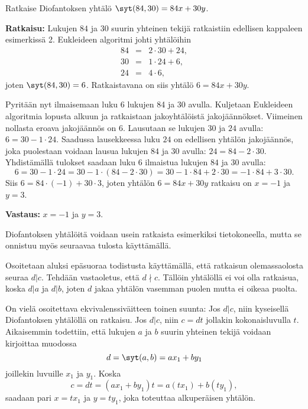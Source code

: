 \begin{esimerkki}
Ratkaise Diofantoksen yhtälö
$\syt(84, 30) = 84x + 30y$.

{\bf Ratkaisu:} Lukujen $84$ ja $30$ suurin yhteinen tekijä
ratkaistiin edellisen kappaleen esimerkissä 2. Eukleideen
algoritmi johti yhtälöihin
\begin{eqnarray*}
84 &=& 2 \cdot 30 + 24,\\
30 &=& 1 \cdot 24 + 6,\\
24 &=& 4 \cdot 6,
\end{eqnarray*}
joten $\syt(84, 30) = 6$. Ratkaistavana on siis yhtälö $6
= 84x + 30y$.

Pyritään nyt ilmaisemaan luku 6 lukujen 84 ja 30 avulla.
Kuljetaan Eukleideen algoritmia lopusta alkuun ja
ratkaistaan jakoyhtälöistä jakojäännökset. Viimeinen
nollasta eroava jakojäännös on $6$. Lausutaan se lukujen
$30$ ja $24$ avulla: $6 = 30 - 1 \cdot 24$. Saadussa
lausekkeessa luku $24$ on edellisen yhtälön jakojäännös,
joka puolestaan voidaan lausua lukujen $84$ ja $30$
avulla: $24 = 84 - 2 \cdot 30$. Yhdistämällä tulokset
saadaan luku $6$ ilmaistua lukujen $84$ ja $30$ avulla:
\[
6 = 30 - 1 \cdot 24 = 30 - 1 \cdot (84 - 2 \cdot 30) = 30
- 1 \cdot 84 + 2 \cdot 30 = -1 \cdot 84 + 3 \cdot 30.
\]
Siis $6 = 84 \cdot (-1) + 30 \cdot 3$, joten yhtälön $6=84x+30y$
ratkaisu on $x = -1$ ja $y = 3$.

{\bf Vastaus:} $x = -1$ ja $y = 3$.
\end{esimerkki}

Diofantoksen yhtälöitä voidaan usein ratkaista esimerkiksi tietokoneella, mutta se onnistuu myös seuraavaa tulosta käyttämällä.


\begin{todistus}

Osoitetaan aluksi epäsuoraa todistusta käyttämällä, että ratkaisun olemassaolosta seuraa $d|c$. Tehdään vastaoletus, että $d \nmid c$. Tällöin yhtälöllä ei voi olla ratkaisua, koska $d|a$ ja $d|b$, joten $d$ jakaa yhtälön vasemman puolen mutta ei oikeaa puolta.

On vielä osoitettava ekvivalenssiväitteen toinen suunta: Jos $d|c$, niin kyseisellä Diofantoksen yhtälöllä on ratkaisu. Jos $d|c$, niin $c=dt$ jollakin kokonaisluvulla $t$. Aikaisemmin todettiin, että lukujen $a$ ja $b$ suurin yhteinen tekijä voidaan kirjoittaa muodossa
\[
d=\syt(a, b)=a x_1 + b y_1
\]
joillekin luvuille $x_1$ ja $y_1$. Koska
\[
c = dt = (ax_1 + by_1)t = a(tx_1)+ b(ty_1),
\]
saadaan pari $x=tx_1$ ja $y=ty_1$, joka toteuttaa alkuperäisen yhtälön.
\end{todistus}

